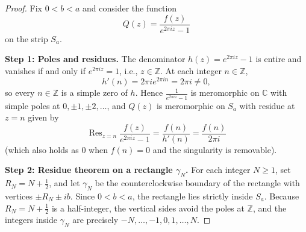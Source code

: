 \documentclass[11pt]{article}
\theoremstyle{plain}
\theoremstyle{definition}
\theoremstyle{boldremark}
\theoremstyle{remark}
\numberwithin{equation}{section}
\newcommand{\C}{\mathbb{C}}
\newcommand{\Z}{\mathbb{Z}}
\begin{document}
\begin{proof}
Fix $0<b<a$ and consider the function
\[
 Q(z) = \frac{f(z)}{e^{2\pi i z}-1}
\]
on the strip $S_a$.

\textbf{Step 1: Poles and residues.}
The denominator $h(z)=e^{2\pi i z}-1$ is entire and vanishes if and only if
$e^{2\pi i z}=1$, i.e., $z\in\Z$. At each integer $n\in\Z$,
\[
 h'(n) = 2\pi i e^{2\pi i n} = 2\pi i \neq 0,
\]
so every $n\in\Z$ is a simple zero of $h$. Hence $\frac{1}{e^{2\pi iz}-1}$
is meromorphic on $\C$ with simple poles at $0,\pm 1,\pm 2,\dots$, and
$Q(z)$ is meromorphic on $S_a$ with residue at $z=n$ given by
\[
 \operatorname{Res}_{z=n}\frac{f(z)}{e^{2\pi i z}-1}
 = \frac{f(n)}{h'(n)} = \frac{f(n)}{2\pi i}
\]
(which also holds as $0$ when $f(n)=0$ and the singularity is removable).

\textbf{Step 2: Residue theorem on a rectangle $\gamma_N$.}
For each integer $N\geq 1$, set $R_N=N+\tfrac12$, and let $\gamma_N$ be the
counterclockwise boundary of the rectangle with vertices $\pm R_N\pm ib$.
Since $0<b<a$, the rectangle lies strictly inside $S_a$. Because
$R_N=N+\tfrac12$ is a half-integer, the vertical sides avoid the poles at
$\Z$, and the integers inside $\gamma_N$ are precisely
$-N,\dots,-1,0,1,\dots,N$.


\end{proof}
\end{document}
